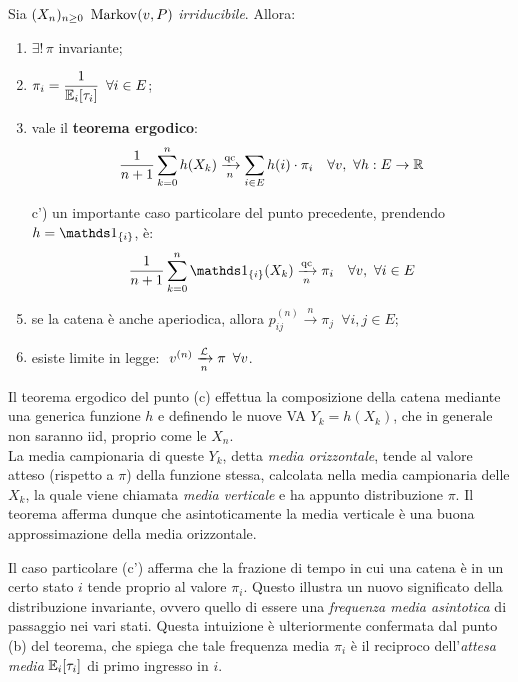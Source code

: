 \begin{teo}
	Sia $(X_n)_{n \ge 0} \ \operatorname{Markov}(v,P)$ \emph{irriducibile}. Allora:
	\begin{enumerate}[label=\alph*)]
		\item $\exists! \, \pi$ invariante;
		\item $\pi_i = \dfrac{1}{\mathbb E_i[\tau_i]} \enspace \forall i \in E$;
		\item vale il \textbf{teorema ergodico}:
		$$\frac{1}{n+1} \sum_{k=0}^n h(X_k) \xrightarrow[n]{\text{qc}} \sum_{i \in E} h(i) \cdot \pi_i \quad
		\forall v, \ \forall h: E \to \mathbb R$$
		\item[c')] un importante caso particolare del punto precedente, prendendo $h = \Ind_{\{i\}}$, è:
		$$\frac{1}{n+1} \sum_{k=0}^n \Ind_{ \{i\} }(X_k) \xrightarrow[n]{\text{qc}} \pi_i \quad
		\forall v, \ \forall i \in E$$
		\item se la catena è anche aperiodica, allora $p_{ij}^{(n)} \xrightarrow{n} \pi_j \enspace \forall i,j \in E$;
		\item esiste limite in legge: $\ v^{(n)} \xrightarrow[n]{\mathcal L} \pi \enspace \forall v$.
	\end{enumerate}
\end{teo}
Il teorema ergodico del punto (c) effettua la composizione della catena mediante una generica funzione $h$ e
definendo le nuove VA $Y_k = h(X_k)$, che in generale non saranno iid, proprio come le $X_n$. \\
La media campionaria di queste $Y_k$, detta \emph{media orizzontale}, tende al valore atteso (rispetto a $\pi$) della funzione stessa,
calcolata nella media campionaria delle $X_k$, la quale viene chiamata \emph{media verticale} e ha appunto distribuzione $\pi$.
Il teorema afferma dunque che asintoticamente la media verticale è una buona approssimazione della media orizzontale.

Il caso particolare (c') afferma che la frazione di tempo in cui una catena è in un certo stato $i$ tende proprio al valore $\pi_i$.
Questo illustra un nuovo significato della distribuzione invariante, ovvero quello di essere una \emph{frequenza media asintotica} di passaggio nei vari stati.
Questa intuizione è ulteriormente confermata dal punto (b) del teorema, che spiega che tale frequenza media $\pi_i$ è il reciproco dell'\emph{attesa media} $\mathbb E_i[\tau_i]$ di primo ingresso in $i$.


